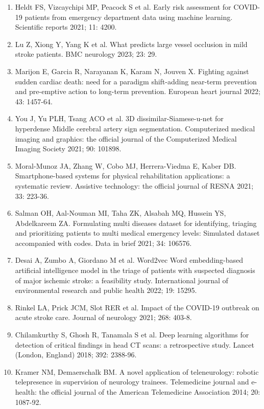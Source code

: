{{\begin{enumerate}
    \item Heldt FS, Vizcaychipi MP, Peacock S et al. Early risk assessment for COVID-19 patients from emergency department data using machine learning. Scientific reports 2021; 11: 4200.
    \item Lu Z, Xiong Y, Yang K et al. What predicts large vessel occlusion in mild stroke patients. BMC neurology 2023; 23: 29.
    \item Marijon E, Garcia R, Narayanan K, Karam N, Jouven X. Fighting against sudden cardiac death: need for a paradigm shift-adding near-term prevention and pre-emptive action to long-term prevention. European heart journal 2022; 43: 1457-64.
    \item You J, Yu PLH, Tsang ACO et al. 3D dissimilar-Siamese-u-net for hyperdense Middle cerebral artery sign segmentation. Computerized medical imaging and graphics: the official journal of the Computerized Medical Imaging Society 2021; 90: 101898.
    \item Moral-Munoz JA, Zhang W, Cobo MJ, Herrera-Viedma E, Kaber DB. Smartphone-based systems for physical rehabilitation applications: a systematic review. Assistive technology: the official journal of RESNA 2021; 33: 223-36.
    \item Salman OH, Aal-Nouman MI, Taha ZK, Alsabah MQ, Hussein YS, Abdelkareem ZA. Formulating multi diseases dataset for identifying, triaging and prioritizing patients to multi medical emergency levels: Simulated dataset accompanied with codes. Data in brief 2021; 34: 106576.
    \item Desai A, Zumbo A, Giordano M et al. Word2vec Word embedding-based artificial intelligence model in the triage of patients with suspected diagnosis of major ischemic stroke: a feasibility study. International journal of environmental research and public health 2022; 19: 15295.
    \item Rinkel LA, Prick JCM, Slot RER et al. Impact of the COVID-19 outbreak on acute stroke care. Journal of neurology 2021; 268: 403-8.
    \item Chilamkurthy S, Ghosh R, Tanamala S et al. Deep learning algorithms for detection of critical findings in head CT scans: a retrospective study. Lancet (London, England) 2018; 392: 2388-96.
    \item Kramer NM, Demaerschalk BM. A novel application of teleneurology: robotic telepresence in supervision of neurology trainees. Telemedicine journal and e-health: the official journal of the American Telemedicine Association 2014; 20: 1087-92.

\end{enumerate}}}
